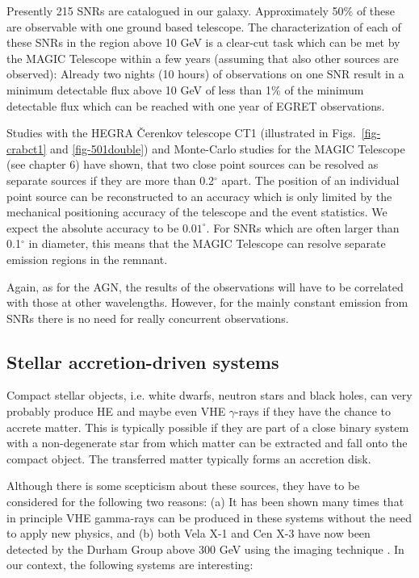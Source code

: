 Presently 215 SNRs are catalogued in our galaxy. Approximately 50\% of these
are observable with one ground based telescope. The characterization of each of
these SNRs in the region above 10 GeV is a clear-cut task which can be met
by the MAGIC Telescope within a few years (assuming that also other sources
are observed): Already two nights (10 hours) of observations on one SNR
result in a minimum detectable flux above 10 GeV of less than 1\% of the
minimum detectable flux which can be reached with one year of EGRET
observations.

Studies with the HEGRA \v{C}erenkov telescope CT1 (illustrated in Figs.~\ref{fig-crabct1} 
and \ref{fig-501double}) and Monte-Carlo studies for the
MAGIC Telescope (see chapter 6) have shown, that two close
point sources can be resolved as separate sources if they are more than 0.2$%
^{\circ }$ apart. The position of an individual point source can be
reconstructed to an accuracy which is only limited by the mechanical
positioning accuracy of the telescope and the event statistics. We expect
the absolute accuracy to be $0.01^{\circ }$. For SNRs which are often larger
than 0.1$^{\circ }$ in diameter, this means that the MAGIC Telescope can
resolve separate emission regions in the remnant.

Again, as for the AGN, the results of the observations will have to be
correlated with those at other wavelengths. However, for the mainly constant
emission from SNRs there is no need for really concurrent observations.

\subsection{Stellar accretion-driven systems}

\medskip Compact stellar objects, i.e. white dwarfs, neutron stars and black holes,
can very probably produce HE and maybe even VHE $\gamma$-rays if they have
the chance to accrete matter. This is typically possible if they are part of
a close binary system with a non-degenerate star from which matter can be
extracted and fall onto the compact object. The transferred matter typically
forms an accretion disk.

Although there is some scepticism about these sources, they have to be
considered for the following two reasons: (a) It has been shown many times
that in principle VHE gamma-rays can be produced in these systems without
the need to apply new physics, and (b) both Vela X-1 and Cen X-3 have now
been detected by the Durham Group above 300 GeV using the imaging
technique \cite{chadwick:95}. In our context, the following
systems are interesting:
\vfill

